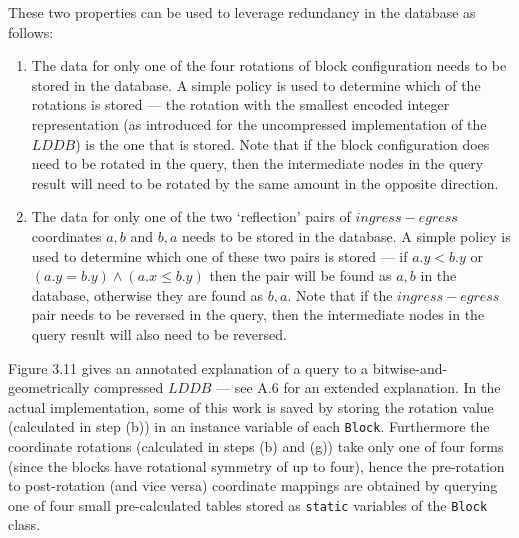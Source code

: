 \documentclass[12pt,notitlepage]{report}
\begin{document}
These two properties can be used to leverage redundancy in the database as follows:
\begin{enumerate}
\item The data for only one of the four rotations of block configuration needs to be stored in the database. A simple policy is used to determine which of the rotations is stored --- the rotation with the smallest encoded integer representation (as introduced for the uncompressed implementation of the $LDDB$) is the one that is stored. Note that if the block configuration does need to be rotated in the query, then the intermediate nodes in the query result will need to be rotated by the same amount in the opposite direction. 
\item The data for only one of the two `reflection' pairs of $ingress-egress$ coordinates $a,b$ and $b,a$ needs to be stored in the database. A simple policy is used to determine which one of these two pairs is stored --- if $a.y < b.y$ or $(a.y = b.y) \land (a.x \leq b.y)$ then the pair will be found as $a,b$ in the database, otherwise they are found as $b,a$. Note that if the $ingress-egress$ pair needs to be reversed in the query, then the intermediate nodes in the query result will also need to be reversed. 
\end{enumerate}

\noindent
Figure 3.11 gives an annotated explanation of a query to a bitwise-and-geometrically compressed $LDDB$ --- see A.6 for an extended explanation. In the actual implementation, some of this work is saved by storing the rotation value (calculated in step (b)) in an instance variable of each {\tt Block}. Furthermore the coordinate rotations (calculated in steps (b) and (g)) take only one of four forms (since the blocks have rotational symmetry of up to four), hence the pre-rotation to post-rotation (and vice versa) coordinate mappings are obtained by querying one of four small pre-calculated tables stored as {\tt static} variables of the {\tt Block} class.\\
\end{document}
